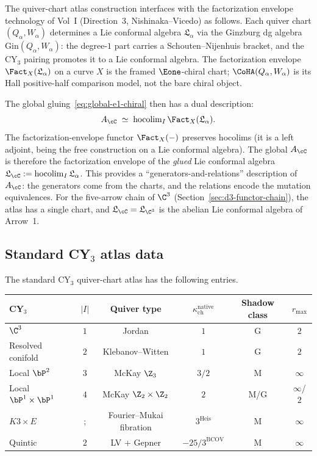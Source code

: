 \begin{remark}
\label{rem:quiver-chart-envelope}
The quiver-chart atlas construction interfaces with the factorization envelope technology of Vol~I (Direction~3, Nishinaka--Vicedo) as follows. Each quiver chart $(Q_\alpha, W_\alpha)$ determines a Lie conformal algebra $\mathfrak{L}_\alpha$ via the Ginzburg dg algebra $\mathrm{Gin}(Q_\alpha, W_\alpha)$: the degree-$1$ part carries a Schouten--Nijenhuis bracket, and the CY$_3$ pairing promotes it to a Lie conformal algebra. The factorization envelope $\Fact_X(\mathfrak{L}_\alpha)$ on a curve $X$ is the framed $\Eone$-chiral chart; $\CoHA(Q_\alpha, W_\alpha)$ is its Hall positive-half comparison model, not the bare chiral object.

The global gluing~\eqref{eq:global-e1-chiral} then has a dual description:
\[
 A_\cC \;\simeq\; \operatorname{hocolim}_I \Fact_X(\mathfrak{L}_\alpha).
\]
The factorization-envelope functor $\Fact_X(-)$ preserves hocolims (it is a left adjoint, being the free construction on a Lie conformal algebra). The global $A_\cC$ is therefore the factorization envelope of the \emph{glued} Lie conformal algebra $\mathfrak{L}_\cC := \operatorname{hocolim}_I \mathfrak{L}_\alpha$. This provides a ``generators-and-relations'' description of $A_\cC$: the generators come from the charts, and the relations encode the mutation equivalences. For the five-arrow chain of $\C^3$ (Section~\ref{sec:d3-functor-chain}), the atlas has a single chart, and $\mathfrak{L}_\cC = \mathfrak{L}_{\C^3}$ is the abelian Lie conformal algebra of Arrow~1.
\end{remark}


\subsection{Standard CY\texorpdfstring{$_3$}{-3} atlas data}
\label{subsec:atlas-data-table}

The standard CY$_3$ quiver-chart atlas has the following entries.

\begin{center}
\renewcommand{\arraystretch}{1.3}
\small
\begin{tabular}{lccccc}
 \toprule
 \textbf{CY$_3$} & $|I|$ & \textbf{Quiver type} & $\kappa_{\mathrm{ch}}^{\mathrm{native}}$ & \textbf{Shadow class} & $r_{\mathrm{max}}$ \\
 \midrule
 $\C^3$ & $1$ & Jordan & $1$ & G & $2$ \\
 Resolved conifold & $2$ & Klebanov--Witten & $1$ & G & $2$ \\
 Local $\bP^2$ & $3$ & McKay $\Z_3$ & $3/2$ & M & $\infty$ \\
 Local $\bP^1 \times \bP^1$ & $4$ & McKay $\Z_2 \times \Z_2$ & $2$ & M/G & $\infty$/$2$ \\
 $K3 \times E$ &; & Fourier--Mukai fibration & $3^{\mathrm{Heis}}$ & M & $\infty$ \\
 Quintic & $2$ & LV + Gepner & $-25/3^{\mathrm{BCOV}}$ & M & $\infty$ \\
 \bottomrule
\end{tabular}
\end{center}
\medskip

